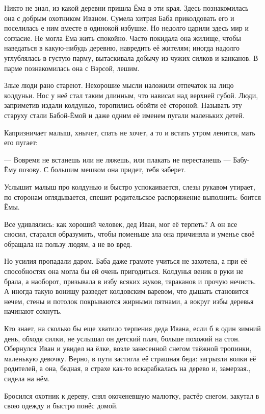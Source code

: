 \documentclass[oneside,final,14pt]{extreport}
\begin{document}
	Никто не знал, из какой деревни пришла Ёма в эти края. Здесь познакомилась она с добрым охотником Иваном. Сумела хитрая Баба приколдовать его и поселилась е ним вместе в одинокой избушке. Но недолго царили здесь мир и согласие. Не могла Ёма жить спокойно. Часто покидала она жилище, чтобы наведаться в какую-нибудь деревню, навредить её жителям; иногда надолго углублялась в густую парму, вытаскивала добычу из чужих силков и канканов. В парме познакомилась она с Вэрсой, лешим.
	
	Злые люди рано стареют. Нехорошие мысли наложили отпечаток на лицо колдуньи. Нос у неё стал таким длинным, что нависал над верхней губой. Люди, заприметив издали колдунью, торопились обойти её стороной. Называть эту старуху стали Бабой-Ёмой и даже одним её именем пугали маленьких детей.
	
	Капризничает малыш, хнычет, спать не хочет, а то и встать утром ленится, мать его пугает:
	
	— Вовремя не встанешь или не ляжешь, или плакать не перестанешь — Бабу-Ёму позову. С большим мешком она придет, тебя заберет.
	
	Услышит малыш про колдунью и быстро успокаивается, слезы рукавом утирает, по сторонам оглядывается, спешит родительское распоряжение выполнить: боится Ёмы.
	
	Все удивлялись: как хороший человек, дед Иван, мог её терпеть? А он все сносил, старался образумить, чтобы поменьше зла она причиняла и уменье своё обращала на пользу людям, а не во вред.
	
	Но усилия пропадали даром. Баба даже грамоте учиться не захотела, а при её способностях она могла бы ей очень пригодиться. Колдунья веник в руки не брала, а наоборот, призывала в избу всяких жуков, тараканов и прочую нечисть. А иногда такую вонищу разведет колдовским варевом, что дышать становится нечем, стены и потолок покрываются жирными пятнами, а вокруг избы деревья начинают сохнуть.
	
	Кто знает, на сколько бы еще хватило терпения деда Ивана, если б в один зимний день, обходя силки, не услышал он детский плач, больше похожий на стон. Обернулся Иван и увидел на ёлке, возле занесенной снегом таёжной тропинки, маленькую девочку. Верно, в пути застигла её страшная беда: загрызли волки её родителей, а она, бедная, в страхе как-то вскарабкалась на дерево и, замерзая., сидела на нём.
	
	Бросился охотник к дереву, снял окоченевшую малютку, растёр снегом, закутал в свою одежду и быстро понёс домой.
	
\end{document}

